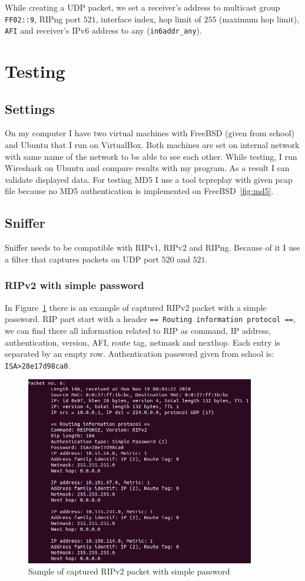 \documentclass[11pt,a4paper]{article}
\begin{document}
\noindent
While creating a UDP packet, we set a receiver's address to multicast group \texttt{FF02::9}, RIPng port $521$, interface index, hop limit of $255$ (maximum hop limit), \texttt{AFI} and receiver's IPv6 address to any (\texttt{in6addr\_any}).

\section{Testing}
\subsection{Settings}
On my computer I have two virtual machines with FreeBSD (given from school) and Ubuntu that I run on VirtualBox. Both machines are set on internal network with same name of the network to be able to see each other. While testing, I run Wireshark on Ubuntu and compare results with my program. As a result I can validate displayed data. For testing MD5 I use a tool tcpreplay with given pcap file because no MD5 authentication is implemented on FreeBSD~\ref{fig:md5}.   

\subsection{Sniffer}
\label{sec:sniffer}
Sniffer needs to be compatible with RIPv1, RIPv2 and RIPng. Because of it I use a filter that captures packets on UDP port $520$ and $521$.

\subsubsection{RIPv2 with simple password}
In Figure~\ref{fig:simple_password} there is an example of captured RIPv2 packet with a simple password. RIP part start with a header \texttt{== Routing information protocol ==}, we can find there all information related to RIP as command, IP address, authentication, version, AFI, route tag, netmask and nexthop. Each entry is separated by an empty row. Authentication password given from school is: \texttt{ISA>28e17d98ca0}.

\begin{figure}[H]
	
	\includegraphics[width=10cm]{img/simple.png} 
	\caption{Sample of captured RIPv2 packet with simple password}
	\label{fig:simple_password}

\end{figure}
\end{document}
